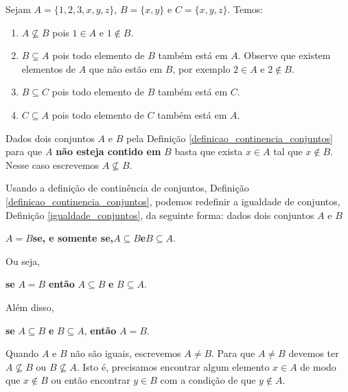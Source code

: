 \begin{exemplos}
    Sejam $A = \{1,2,3,x,y,z\}$, $B = \{x, y\}$ e $C = \{x, y , z\}$. Temos:
    \begin{enumerate}[label={\arabic*})]
        \item $A \nsubseteq B$ pois $1 \in A$ e $1 \notin B$.
        \item $B \subsetneq A$ pois todo elemento de $B$ tamb\'em est\'a em $A$. Observe que existem elementos de $A$ que n\~ao est\~ao em $B$, por exemplo $2 \in A$ e $2 \notin B$.
        \item $B \subseteq C$ pois todo elemento de $B$ tamb\'em est\'a em $C$.
        \item $C \subseteq A$ pois todo elemento de $C$ tamb\'em est\'a em $A$.
    \end{enumerate}
\end{exemplos}

\begin{observacao}
    Dados dois conjuntos $A$ e $B$ pela Defini\c{c}\~ao \ref{definicao_continencia_conjuntos} para que $A$ \textbf{n\~ao esteja contido em} $B$ basta que exista $x \in A$ tal que $x \notin B$. Nesse caso escrevemos $A \nsubseteq B$.
\end{observacao}

Usando a defini\c{c}\~ao de contin\^encia de conjuntos, Defini\c{c}\~ao \ref{definicao_continencia_conjuntos}, podemos redefinir a igualdade de conjuntos, Defini\c{c}\~ao \ref{igualdade_conjuntos}, da seguinte forma: dados dois conjuntos $A$ e $B$
\begin{center}
    $A = B$\quad \textbf{se, e somente se,}\quad $A \subseteq B$\quad \textbf{e}\quad $B \subseteq A$.
\end{center}

Ou seja,
\begin{center}
    \textbf{se} $A = B$ \textbf{ent{\~a}o} $A \subseteq B$ \textbf{e} $B \subseteq A$.
\end{center}

Al\'em disso,
\begin{center}
    \textbf{se} $A \subseteq B$ \textbf{e} $B \subseteq A$, \textbf{ent{\~a}o} $A = B$.
\end{center}

Quando $A$ e $B$ n{\~a}o s{\~a}o iguais, escrevemos $A \neq B$. Para que $A \neq B$ devemos ter $A \nsubseteq B$ ou $B \nsubseteq A$. Isto \'e, precisamos encontrar algum elemento $x \in A$ de modo que $x \notin B$ ou ent\~ao encontrar $y \in B$ com a condição de que $y \notin A$.

